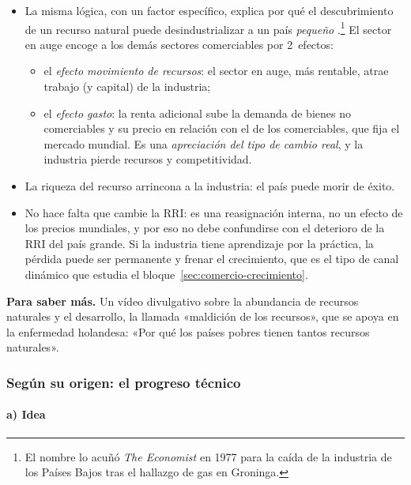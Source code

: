 \documentclass[11pt]{article}
\begin{document}
\begin{itemize}
\item La misma lógica, con un factor específico, explica por qué el descubrimiento de un recurso natural puede desindustrializar a un país \emph{pequeño}\nocite{CordenNeary1982} .\footnote{El nombre lo acuñó \emph{The Economist} en 1977 para la caída de la industria de los Países Bajos tras el hallazgo de gas en Groninga\nocite{Economist1977Dutch}.} El sector en auge encoge a los demás sectores comerciables por 2~efectos:
  \begin{itemize}
  \item el \emph{efecto movimiento de recursos}: el sector en auge, más rentable, atrae trabajo (y capital) de la industria;
  \item el \emph{efecto gasto}: la renta adicional sube la demanda de bienes no comerciables y su precio en relación con el de los comerciables, que fija el mercado mundial. Es una \emph{apreciación del tipo de cambio real}, y la industria pierde recursos y competitividad.
  \end{itemize}
\item La riqueza del recurso arrincona a la industria: el país puede morir de éxito.
\item No hace falta que cambie la RRI: es una reasignación interna, no un efecto de los precios mundiales, y por eso no debe confundirse con el deterioro de la RRI del país grande. Si la industria tiene aprendizaje por la práctica, la pérdida puede ser permanente y frenar el crecimiento\nocite{Krugman1987Narrow}, que es el tipo de canal dinámico que estudia el bloque~\ref{sec:comercio-crecimiento}.
\end{itemize}

\begin{anotaciones}
\textbf{Para saber más.} Un vídeo divulgativo sobre la abundancia de recursos naturales y el desarrollo, la llamada «maldición de los recursos», que se apoya en la enfermedad holandesa: «Por qué los países pobres tienen tantos recursos naturales»\nocite{VisualEconomikRecursos}.
\end{anotaciones}

\subsubsection{Según su origen: el progreso técnico}\label{sec:progreso}

\paragraph{a) Idea}
\end{document}

